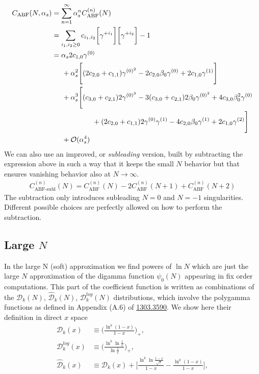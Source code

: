 \documentclass[12pt]{article}
\begin{document}
\begin{align}
	C_{\textrm{ABF}} (N, \alpha_{s} ) &= \sum_{n = 1}^{\infty} \alpha_{s}^{n} C_{\textrm{ABF}}^{(n)}(N) \\
	& = \sum_{i_{1}, i_{2} \geq 0} c_{i_{1}, i_{2}} \bigg[ \gamma^{+i_{1}} \bigg] \bigg[ \gamma^{+i_{2}} \bigg] - 1\\
	&= \alpha_{s} 2 c_{1, 0} \gamma^{(0)} \\ \nonumber
	& \hspace{0.5cm} + \alpha_{s}^{2} \Bigg[(2 c_{2, 0} + c_{1, 1}) \gamma^{(0)^{2}} - 2 c_{2, 0} \beta_{0} \gamma^{(0)} + 2 c_{1, 0} \gamma^{(1)} \Bigg] \\
	& \hspace{0.5cm} + \alpha_{s}^{3} \Bigg[(c_{3, 0} + c_{2, 1})2\gamma^{(0)^{3}} - 3 (c_{3, 0} + c_{2, 1}) 2 \beta_{0} \gamma^{(0)^{2}} + 4c_{3, 0}\beta_{0}^{2}\gamma^{(0)} \\ \nonumber
	& \hspace{2.0cm} + (2c_{2, 0} + c_{1, 1})2\gamma^{(0)}\gamma^{(1)} - 4c_{2, 0}\beta_{0}\gamma^{(1)} + 2c_{1, 0}\gamma^{(2)} \Bigg] \\ \nonumber
	& \hspace{0.5cm} + \mathcal{O}(\alpha_{s}^{4})
\end{align}
We can also use an improved, or \textit{subleading} version, built by subtracting the expression above in such a way that it keeps the small $N$ behavior but that ensures vanishing behavior also at $N \rightarrow \infty$.
\begin{align}
C_{\textrm{ABF-subl}}^{(n)}(N) = C_{\textrm{ABF}}^{(n)}(N) - 2 C_{\textrm{ABF}}^{(n)}(N + 1) + C_{\textrm{ABF}}^{(n)}(N + 2)
\end{align}
The subtraction only introduces subleading $N = 0$ and $N = -1$ singularities. Different possible choices are perfectly allowed on how to perform the subtraction.

\subsection{Large $N$}
In the large N (soft) approximation we find powers of  $\ln N$ which are just the large $N$ approximation of the digamma function $\psi_{0}(N)$  appearing in fix order computations. This part of the coefficient function is written as combinations of the $\mathcal{D}_{k}(N)$, $\hat{\mathcal{D}}_{k}(N)$, $\mathcal{D}^{log}_{k}(N)$ distributions, which involve the polygamma functions as defined in Appendix (A.6) of \href{https://arxiv.org/abs/1303.3590}{1303.3590}. We show here their definition in direct $x$ space
\begin{align}
	\mathcal{D}_{k}(x) &\equiv \Bigg( \frac{\ln^{k}(1 - x)}{1 - x} \Bigg)_{+} ,\\
	\mathcal{D}_{k}^{log}(x) &\equiv \Bigg( \frac{\ln^{k}\ln\frac{1}{x}}{\ln\frac{1}{x}} \Bigg)_{+}, \\
	\hat{\mathcal{D}}_{k}(x) &\equiv \mathcal{D}_{k}(x) + \Bigg[ \frac{\ln^{k}\ln\frac{1 - x}{\sqrt{x}}}{1 - x} - \frac{\ln^{k}(1 - x)}{1 - x} \Bigg],
\end{align}
\end{document}
